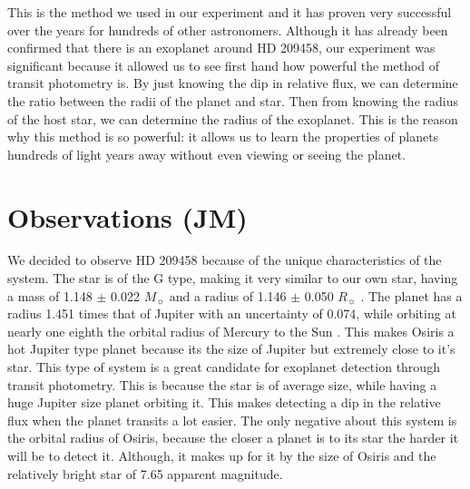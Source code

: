 \documentclass{aastex61}
\begin{document}
This is the method we used in our experiment and it has proven very successful over the years for hundreds of other astronomers. Although it has already been confirmed that there is an exoplanet around HD 209458, our experiment was significant because it allowed us to see first hand how powerful the method of transit photometry is. By just knowing the dip in relative flux, we can determine the ratio between the radii of the planet and star. Then from knowing the radius of the host star, we can determine the radius of the exoplanet. This is the reason why this method is so powerful: it allows us to learn the properties of planets hundreds of light years away without even viewing or seeing the planet. 

\section{Observations (JM)}
We decided to observe HD 209458 because of the unique characteristics of the system. The star is of the G type, making it very similar to our own star, having a mass of 1.148 $\pm$ 0.022 $M_\sun$ \citep{2010MNRAS.408.1689S} and a radius of 1.146 $\pm$ 0.050 $R_\sun$ \citep{2001ApJ...552..699B}. The planet has a radius 1.451 times that of Jupiter with an uncertainty of 0.074, while orbiting at nearly one eighth the orbital radius of Mercury to the Sun \citep{2015MNRAS.447..846B}. This makes Osiris a hot Jupiter type planet because its the size of Jupiter but extremely close to it's star. This type of system is a great candidate for exoplanet detection through transit photometry. This is because the star is of average size, while having a huge Jupiter size planet orbiting it. This makes detecting a dip in the relative flux when the planet transits a lot easier. The only negative about this system is the orbital radius of Osiris, because the closer a planet is to its star the harder it will be to detect it. Although, it makes up for it by the size of Osiris and the relatively bright star of 7.65 apparent magnitude.
\end{document}
